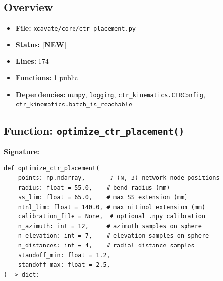 \documentclass[11pt,a4paper]{article}
\newcommand{\filename}[1]{\texttt{\textcolor{accentblue}{#1}}}
\newcommand{\funcname}[1]{\texttt{\textcolor{codepurple}{#1}}}
\newcommand{\newlabel}{\textcolor{newfile}{\textbf{[NEW]}}}
\begin{document}
\subsection{Overview}

\begin{itemize}[nosep]
    \item \textbf{File:} \filename{xcavate/core/ctr\_placement.py}
    \item \textbf{Status:} \newlabel
    \item \textbf{Lines:} 174
    \item \textbf{Functions:} 1 public
    \item \textbf{Dependencies:} \texttt{numpy}, \texttt{logging}, \texttt{ctr\_kinematics.CTRConfig}, \texttt{ctr\_kinematics.batch\_is\_reachable}
\end{itemize}

\subsection{Function: \funcname{optimize\_ctr\_placement()}}

\textbf{Signature:}
\begin{lstlisting}
def optimize_ctr_placement(
    points: np.ndarray,       # (N, 3) network node positions
    radius: float = 55.0,    # bend radius (mm)
    ss_lim: float = 65.0,    # max SS extension (mm)
    ntnl_lim: float = 140.0, # max nitinol extension (mm)
    calibration_file = None,  # optional .npy calibration
    n_azimuth: int = 12,     # azimuth samples on sphere
    n_elevation: int = 7,    # elevation samples on sphere
    n_distances: int = 4,    # radial distance samples
    standoff_min: float = 1.2,
    standoff_max: float = 2.5,
) -> dict:
\end{lstlisting}
\end{document}
